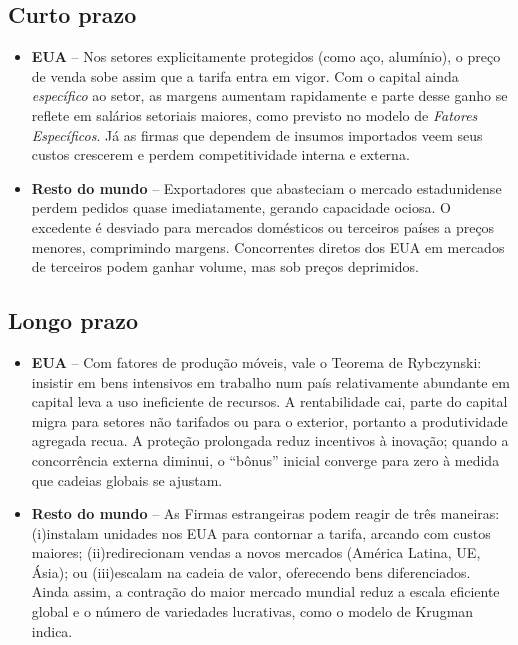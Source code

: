 \documentclass[a4paper,12pt]{article}[abntex2]
\begin{document}
\subsection*{\textbf{Curto prazo}}

\begin{itemize}
  \item \textbf{EUA} – Nos setores explicitamente protegidos (como aço, alumínio), o preço de venda sobe assim que a tarifa entra em vigor. Com o capital ainda \emph{específico} ao setor, as margens aumentam rapidamente e parte desse ganho se reflete em salários setoriais maiores, como previsto no modelo de \textit{Fatores Específicos}. Já as firmas que dependem de insumos importados veem seus custos crescerem e perdem competitividade interna e externa.

  \item \textbf{Resto do mundo} – Exportadores que abasteciam o mercado estadunidense perdem pedidos quase imediatamente, gerando capacidade ociosa. O excedente é desviado para mercados domésticos ou terceiros países a preços menores, comprimindo margens. Concorrentes diretos dos EUA em mercados de terceiros podem ganhar volume, mas sob preços deprimidos.
\end{itemize}

\subsection*{\textbf{Longo prazo}}

\begin{itemize}
  \item \textbf{EUA} – Com fatores de produção móveis, vale o Teorema de Rybczynski: insistir em bens intensivos em trabalho num país relativamente abundante em capital leva a uso ineficiente de recursos. A rentabilidade cai, parte do capital migra para setores não tarifados ou para o exterior, portanto a produtividade agregada recua. A proteção prolongada reduz incentivos à inovação; quando a concorrência externa diminui, o “bônus” inicial converge para zero à medida que cadeias globais se ajustam.
  \item \textbf{Resto do mundo} – As Firmas estrangeiras podem reagir de três maneiras: (i)instalam unidades nos EUA para contornar a tarifa, arcando com custos maiores; (ii)redirecionam vendas a novos mercados (América Latina, UE, Ásia); ou (iii)escalam na cadeia de valor, oferecendo bens diferenciados. Ainda assim, a contração do maior mercado mundial reduz a escala eficiente global e o número de variedades lucrativas, como o modelo de Krugman indica.
\end{itemize}
\end{document}
